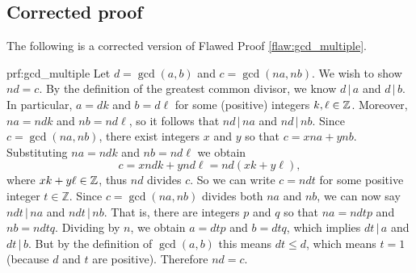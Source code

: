 \clearpage
\subsection{Corrected proof}

The following is a corrected version of Flawed Proof \ref{flaw:gcd_multiple}. %

\begin{prf}{prf:gcd_multiple} %
Let $d = \gcd(a,b)$ and $c = \gcd(na, nb)$. We wish to show $nd = c$. By the definition of the greatest common divisor, we know $d\, |\, a$ and $d\, | \,b$.  In particular, $a = dk$ and $b=d\ell$ for some (positive) integers $k,\ell \in \mathbb Z$.  Moreover, $na = ndk$ and $nb = nd\ell$, so it follows that  $nd \, | \,na$ and $nd \, | \, nb$. 
Since $c = \gcd(na, nb)$, there exist integers $x$ and $y$ so that $c = xna + ynb$.
Substituting $na = ndk$ and $nb = nd\ell$ we obtain \[ c = xndk + ynd\ell = nd(xk + y\ell),\]
where $xk + y\ell \in \mathbb Z$, thus $nd$ divides $c$.
So we can write $c = ndt$ for some positive integer $t \in \mathbb{Z}$. 
Since $c=\gcd(na,nb)$ divides both $na$ and $nb$, 
we can now say $ndt \, | \, na$ and $ndt \, | \, nb$.
That is, there are integers $p$ and $q$ so that $na = ndtp$ and $nb = ndtq$.  Dividing by $n$, we obtain $a = dtp$ and $b=dtq$, which implies $dt \, | \, a$ and $dt \, | \, b$. 
But by the definition of $\gcd(a,b)$ this means $dt \leq d$, which means $t = 1$ (because $d$ and $t$ are positive). Therefore $nd = c$.
\end{prf}